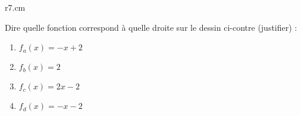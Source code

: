 
\begin{exercice}\label{exosmath-0679}

\begin{wrapfigure}{r}{7.cm}
   \vspace{-0.5cm}        %
   \centering
   
\end{wrapfigure}

\let\Oldtheenumi\theenumi
\renewcommand{\theenumi}{(\alph{enumi})}
Dire quelle fonction correspond à quelle droite sur le dessin ci-contre (justifier) :
\begin{enumerate}
    \item
        \( f_a(x)=-x+2\)
    \item
        \( f_b(x)=2\)
    \item
        \( f_c(x)=2x-2\)
    \item
        \( f_d(x)=-x-2\)
\end{enumerate}

\let\theenumi\Oldtheenumi

\end{exercice}
